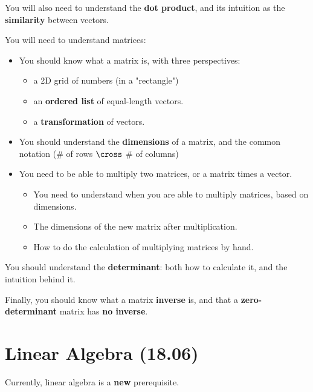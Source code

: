     You will also need to understand the \textbf{dot product}, and its intuition as the \textbf{similarity} between vectors.
    
    You will need to understand matrices:
    
    \begin{itemize}
        \item You should know what a matrix is, with three perspectives: 
            \begin{itemize}
                \item a 2D grid of numbers (in a "rectangle")
                \item an \textbf{ordered list} of equal-length vectors.
                \item a \textbf{transformation} of vectors.
            \end{itemize}
        
        \item You should understand the \textbf{dimensions} of a matrix, and the common notation  (\# of rows $\cross$ \# of columns)
        
        \item You need to be able to multiply two matrices, or a matrix times a vector.
            \begin{itemize}
                \item You need to understand when you are able to multiply matrices, based on dimensions.
                \item The dimensions of the new matrix after multiplication.
                \item How to do the calculation of multiplying matrices by hand.
            \end{itemize}
    \end{itemize}
    
    You should understand the \textbf{determinant}: both how to calculate it, and the intuition behind it.
    
    Finally, you should know what a matrix \textbf{inverse} is, and that a \textbf{zero-determinant} matrix has \textbf{no inverse}.
    
    
\section{Linear Algebra (18.06)}

    Currently, linear algebra is a \textbf{new} prerequisite.
    
